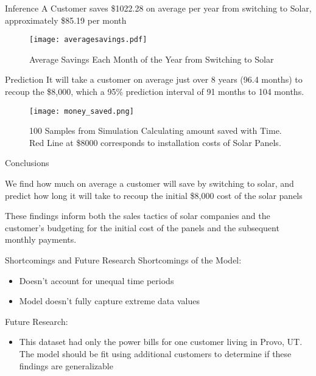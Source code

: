 \documentclass[10pt]{beamer}
\begin{document}
\begin{frame}{Inference}
A Customer saves \$1022.28 on average per year from switching to Solar, approximately \$85.19 per month
\begin{figure}
\begin{center}
\texttt{[image: averagesavings.pdf]}
\smallskip
\caption{Average Savings Each Month of the Year from Switching to Solar}
\end{center}
\end{figure} 
\end{frame}

\begin{frame}{Prediction}
It will take a customer on average just over 8 years (96.4 months) to recoup the \$8,000, which a 95\% prediction interval of 91 months to 104 months.
\begin{figure}
\begin{center}
\texttt{[image: money\_saved.png]}
\smallskip
\caption{100 Samples from Simulation Calculating amount saved with Time. Red Line at \$8000 corresponds to installation costs of Solar Panels.}
\end{center}
\end{figure} 
\end{frame}

\begin{frame}{Conclusions}
\itemize
\item We find how much on average a customer will save by switching to solar, and predict how long it will take to recoup the initial \$8,000 cost of the solar panels
\item These findings inform both the sales tactics of solar companies and the customer's budgeting for the initial cost of the panels and the subsequent monthly payments.
\end{frame}

\begin{frame}{Shortcomings and Future Research}
Shortcomings of the Model:
\begin{itemize}
\item Doesn't account for unequal time periods
\item Model doesn't fully capture extreme data values
\end{itemize}
Future Research:
\begin{itemize}
\item This dataset had only the power bills for one customer living in Provo, UT. The model should be fit using additional customers to determine if these findings are generalizable
\end{itemize}
\end{frame}
\end{document}
